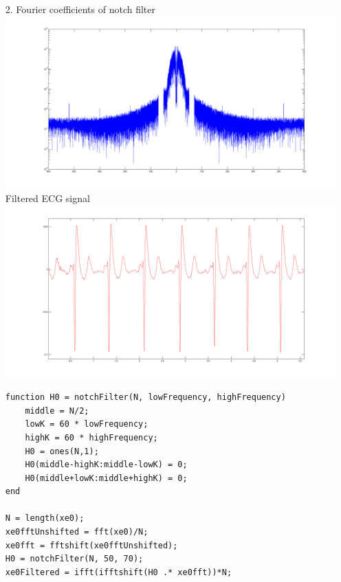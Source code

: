 \documentclass{article}
\begin{document}
\begin{enumerate}
\begin{enumerate}
	\end{enumerate}

\newpage

\item[2.]
	Fourier coefficients of notch filter\\
	\includegraphics[scale=0.25]{../images/P2_FilteredFourierCoefficients} \\
	
	Filtered ECG signal\\
	\includegraphics[scale=0.25]{../images/P2_FilteredECG} \\

\begin{lstlisting}
function H0 = notchFilter(N, lowFrequency, highFrequency)
    middle = N/2;
    lowK = 60 * lowFrequency;
    highK = 60 * highFrequency;
    H0 = ones(N,1);
    H0(middle-highK:middle-lowK) = 0;
    H0(middle+lowK:middle+highK) = 0;
end

N = length(xe0);
xe0fftUnshifted = fft(xe0)/N;
xe0fft = fftshift(xe0fftUnshifted);
H0 = notchFilter(N, 50, 70);
xe0Filtered = ifft(ifftshift(H0 .* xe0fft))*N;
\end{lstlisting}

\newpage


\end{enumerate}
\end{document}
